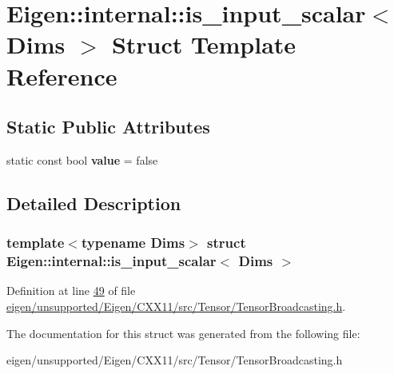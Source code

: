 \hypertarget{struct_eigen_1_1internal_1_1is__input__scalar}{}\section{Eigen\+:\+:internal\+:\+:is\+\_\+input\+\_\+scalar$<$ Dims $>$ Struct Template Reference}
\label{struct_eigen_1_1internal_1_1is__input__scalar}
\subsection*{Static Public Attributes}
\begin{DoxyCompactItemize}
\item 
\mbox{\label{struct_eigen_1_1internal_1_1is__input__scalar_a4b9b59de596ef3271aabccf734822848}} 
static const bool {\bfseries value} = false
\end{DoxyCompactItemize}


\subsection{Detailed Description}
\subsubsection*{template$<$typename Dims$>$\newline
struct Eigen\+::internal\+::is\+\_\+input\+\_\+scalar$<$ Dims $>$}



Definition at line \hyperlink{eigen_2unsupported_2_eigen_2_c_x_x11_2src_2_tensor_2_tensor_broadcasting_8h_source_l00049}{49} of file \hyperlink{eigen_2unsupported_2_eigen_2_c_x_x11_2src_2_tensor_2_tensor_broadcasting_8h_source}{eigen/unsupported/\+Eigen/\+C\+X\+X11/src/\+Tensor/\+Tensor\+Broadcasting.\+h}.



The documentation for this struct was generated from the following file\+:\begin{DoxyCompactItemize}
\item 
eigen/unsupported/\+Eigen/\+C\+X\+X11/src/\+Tensor/\+Tensor\+Broadcasting.\+h\end{DoxyCompactItemize}

